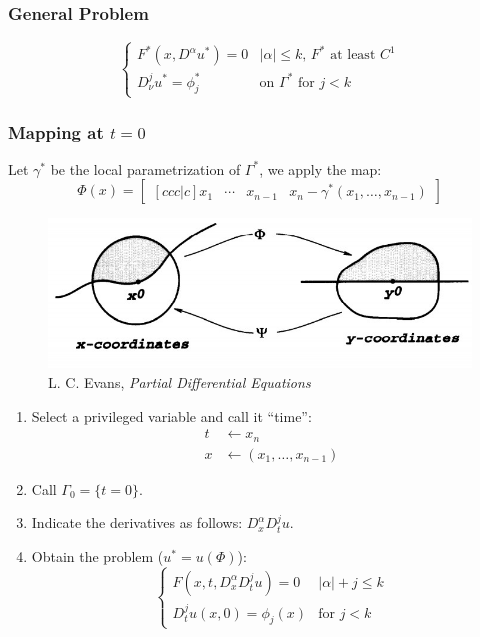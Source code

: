 \documentclass[serif,notheorems]{beamer}
\theoremstyle{definition} %
\theoremstyle{remark}
\begin{document}
\begin{frame}
\frametitle{General Problem}
\begin{equation*}
\begin{cases}
F^*(x,D^\alpha u^*)=0 & |\alpha | \leq k, \, F^* \text{ at least } C^1\\
D^j_\nu u^* = \phi_j^* & \text{on } \Gamma^* \text{ for }j<k 
\end{cases}
\end{equation*}
\end{frame}

\begin{frame}
\frametitle{Mapping at $t=0$}
Let $\gamma^*$ be the local parametrization of $\Gamma^*$, we apply the map:
$$\Phi (x) = 
\begin{bmatrix}[ccc|c]
x_1 & \cdots & x_{n-1} & x_n-\gamma^* (x_1,\ldots , x_{n-1})
\end{bmatrix}$$
\begin{figure}[H]
\centering
\includegraphics[scale=.35]{flatb}
\caption{\tiny{L. C. Evans, \textit{Partial Differential Equations}}}
\end{figure}
\end{frame}

\begin{frame}
\begin{enumerate}
\item Select a privileged variable and call it ``time'':
\begin{align*}
t & \leftarrow x_n \\
x & \leftarrow (x_1,\ldots , x_{n-1})
\end{align*}
\item Call $\Gamma_0 = \{t=0\}$.
\item Indicate the derivatives as follows: $D^\alpha_x D^j_t u$.
\item Obtain the problem ($u^*=u(\Phi)$):
\begin{equation*}
\begin{cases}
F(x,t, D^\alpha_x D^j_t u)=0 & |\alpha | +j \leq k\\
D^j_t u (x,0)= \phi_j(x) & \text{for }j<k 
\end{cases}
\end{equation*}
\end{enumerate}
\end{frame}
\end{document}
